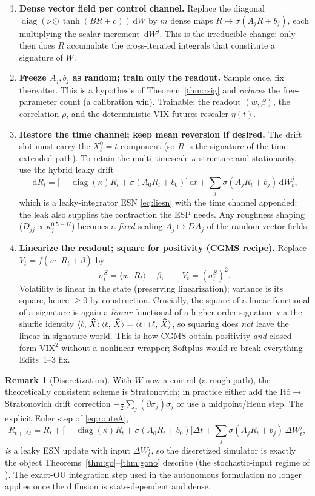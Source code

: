 \documentclass[11pt]{article}
\theoremstyle{definition}
\newtheorem{remark}{Remark}[section]
\theoremstyle{plain}
\newcommand{\diag}{\operatorname{diag}}
\newcommand{\dd}{\,\mathrm{d}}
\newcommand{\inner}[2]{\langle #1,\, #2\rangle}
\newcommand{\shuffle}{\mathbin{\text{\rotatebox[origin=c]{180}{$\sqcap$}}}}
\begin{document}
\begin{enumerate}[label=\textbf{Edit \arabic*.},leftmargin=*]
\item \textbf{Dense vector field per control channel.} Replace the diagonal $\diag(\nu\odot\tanh(BR+c))\dd W$ by $m$ dense maps $R\mapsto\sigma(A_jR+b_j)$, each multiplying the scalar increment $\dd W^j$. This is the irreducible change: only then does $R$ accumulate the cross-iterated integrals that constitute a signature of $W$.
\item \textbf{Freeze $A_j,b_j$ as random; train only the readout.} Sample once, fix thereafter. This is a hypothesis of Theorem~\ref{thm:rsig} and \emph{reduces} the free-parameter count (a calibration win). Trainable: the readout $(w,\beta)$, the correlation $\rho$, and the deterministic $\mathrm{VIX}$-futures rescaler $\eta(t)$.
\item \textbf{Restore the time channel; keep mean reversion if desired.} The drift slot must carry the $X^0_t=t$ component (so $R$ is the signature of the time-extended path). To retain the multi-timescale $\kappa$-structure and stationarity, use the hybrid leaky drift
\[
\dd R_t=\big[-\diag(\kappa)R_t+\sigma(A_0R_t+b_0)\big]\dd t+\sum_{j}\sigma(A_jR_t+b_j)\dd W^j_t,
\]
which is a leaky-integrator ESN \eqref{eq:liesn} with the time channel appended; the leak also supplies the contraction the ESP needs. Any roughness shaping ($D_{jj}\propto\kappa_j^{0.5-H}$) becomes a \emph{fixed} scaling $A_j\mapsto DA_j$ of the random vector fields.
\item \textbf{Linearize the readout; square for positivity (CGMS recipe).} Replace $V_t=f(w^\top R_t+\beta)$ by
\[
\sigma^S_t=\inner{w}{R_t}+\beta,\qquad V_t=(\sigma^S_t)^2 .
\]
Volatility is linear in the state (preserving linearization); variance is its square, hence $\ge 0$ by construction. Crucially, the square of a linear functional of a signature is again a \emph{linear} functional of a higher-order signature via the shuffle identity $\inner{\ell}{\widehat X}\,\inner{\ell}{\widehat X}=\inner{\ell\shuffle\ell}{\widehat X}$, so squaring does \emph{not} leave the linear-in-signature world. This is how CGMS \cite{cgms2025} obtain positivity \emph{and} closed-form $\mathrm{VIX}^2$ without a nonlinear wrapper; $\mathrm{Softplus}$ would re-break everything Edits~1--3 fix.
\end{enumerate}

\begin{remark}[Discretization]
\label{rem:disc}
With $W$ now a control (a rough path), the theoretically consistent scheme is Stratonovich; in practice either add the It\^o$\to$Stratonovich drift correction $-\tfrac12\sum_j(\partial\sigma_j)\sigma_j$ or use a midpoint/Heun step. The explicit Euler step of \eqref{eq:routeA},
\[
R_{t+\Delta t}=R_t+\big[-\diag(\kappa)R_t+\sigma(A_0R_t+b_0)\big]\Delta t+\sum_j\sigma(A_jR_t+b_j)\,\Delta W^j_t,
\]
\emph{is} a leaky ESN update with input $\Delta W^j_t$, so the discretized simulator is exactly the object Theorems~\ref{thm:go}--\ref{thm:gono} describe (the stochastic-input regime of \cite{gononortega2020}). The exact-OU integration step used in the autonomous formulation no longer applies once the diffusion is state-dependent and dense.
\end{remark}
\end{document}
